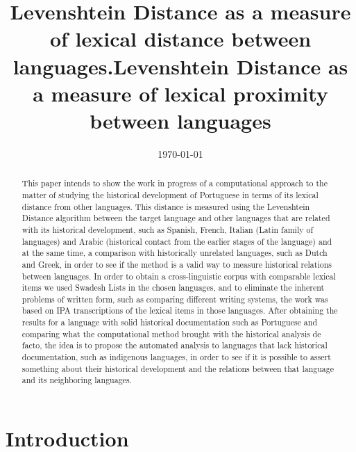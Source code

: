 \documentclass[runningheads]{llncs}
\author{}
\date{\today}
\title{Levenshtein Distance as a measure of lexical distance between languages.}
\begin{document}
\title{Levenshtein Distance as a measure of lexical proximity between languages}
%
%
%
%

\maketitle              %
%
\begin{abstract}
This paper intends to show the work in progress of a computational approach to the matter of studying the historical development of Portuguese in terms of its lexical distance from other languages.
This distance is measured using the Levenshtein Distance algorithm between the target language and other languages that are related with its historical development, such as Spanish, French, Italian (Latin family of languages) and Arabic (historical contact from the earlier stages of the language) and at the same time, a comparison with historically unrelated languages, such as Dutch and Greek, in order to see if the method is a valid way to measure historical relations between languages.
In order to obtain a cross-linguistic corpus with comparable lexical items we used Swadesh Lists in the chosen languages, and to eliminate the inherent problems of written form, such as comparing different writing systems, the work was based on IPA transcriptions of the lexical items in those languages.
After obtaining the results for a language with solid historical documentation such as Portuguese and comparing what the computational method brought with the historical analysis de facto, the idea is to propose the automated analysis to languages that lack historical documentation, such as indigenous languages, in order to see if it is possible to assert something about their historical development and the relations between that language and its neighboring languages.
\end{abstract}
%
%
%
\section{Introduction}
\end{document}

